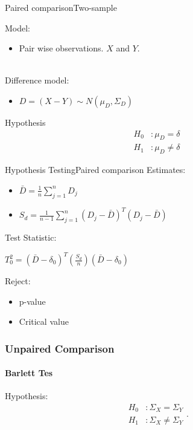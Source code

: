 \documentclass[aspectratio=169,10pt,t]{beamer}
\begin{document}
\begin{frame}{Paired comparison}{Two-sample}

	Model:
	\begin{itemize}
		\item Pair wise observations. $X$ and $Y$.
	\end{itemize}
	\\
	Difference model:
	\begin{itemize}
		\item 
			$ D =   \left( X - Y  \right)  \sim N \left( \mu_D, \Sigma_D  \right)  $
	\end{itemize}

	Hypothesis
	\begin{align*}
		H_0&: \mu_D = \delta\\
		H_1&: \mu_D \neq \delta
	\end{align*}

\end{frame}

\begin{frame}{Hypothesis Testing}{Paired comparison}
    Estimates: \\
        \begin{itemize}
            \item $\bar{D} = \frac{1}{n} \sum^n_{j=1} D_j$ 
            \item $S_d = \frac{1}{n-1} \sum^n_{j=1} \left(D_j - \bar{D} \right)^T \left(D_j - \bar{D} \right)$ 
        \end{itemize}
        Test Statistic: \\
        \begin{center}
                    \quad $T_0^2 = \left( \bar{D} - \delta_0 \right)^T \left( \frac{S_d}{n} \right) \left( \bar{D} - \delta_0 \right)$ \\
        \end{center}
    Reject: \\
    \begin{itemize}
        \item p-value
        \item Critical value
    \end{itemize}
\end{frame}

\begin{frame}[t]
	\frametitle{Unpaired Comparison }
	\framesubtitle{Barlett Tes}
	
	Hypothesis:
	\[
		\begin{aligned}
			H_0 &: \Sigma_X = \Sigma_Y\\
			H_1 &: \Sigma_X \neq \Sigma_Y
		\end{aligned}
	.\] 
\end{frame}
\end{document}
